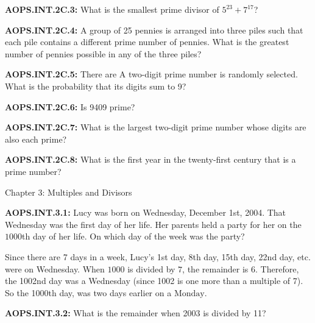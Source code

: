 \documentclass[11pt]{article}
\newenvironment{uzdevums}[1][\unskip]{%
\vspace{3mm}
\noindent
\textbf{#1:}
\noindent}
{}
\begin{document}
\begin{uzdevums}[AOPS.INT.2C.3]
What is the smallest prime divisor of $5^{23} + 7^{17}$?
\end{uzdevums}

\begin{uzdevums}[AOPS.INT.2C.4]
A group of 25 pennies is arranged into three piles such that each pile contains a different prime number of pennies. What is the greatest number of pennies possible in any of the three piles?
\end{uzdevums}

\begin{uzdevums}[AOPS.INT.2C.5]
There are 
A two-digit prime number is randomly selected. What is the probability that its digits sum to 9?
\end{uzdevums}

\begin{uzdevums}[AOPS.INT.2C.6]
Is 9409 prime?
\end{uzdevums}

\begin{uzdevums}[AOPS.INT.2C.7]
What is the largest two-digit prime number whose digits are also each prime?
\end{uzdevums}

\begin{uzdevums}[AOPS.INT.2C.8]
What is the first year in the twenty-first century that is a prime number?
\end{uzdevums}


\vspace{30px}
\begin{center}
{\large Chapter 3: Multiples and Divisors}
\end{center}

\begin{uzdevums}[AOPS.INT.3.1]
Lucy was born on Wednesday, December 1st, 2004. That Wednesday was the first day of her life. Her parents held a party for her on the $1000$th day of her life. On which day of the week was the party?
\end{uzdevums}

Since there are 7 days in a week, Lucy's 1st day, 8th day, 15th day, 22nd day, etc. were on Wednesday. When $1000$ is divided by $7$, the remainder is $6$. Therefore, the 1002nd day was a Wednesday (since 1002 is one more than a multiple of 7). So the 1000th day, was two days earlier on a $\boxed{\text{Monday}}$.


\begin{uzdevums}[AOPS.INT.3.2]
What is the remainder when 2003 is divided by 11?
\end{uzdevums}
\end{document}
